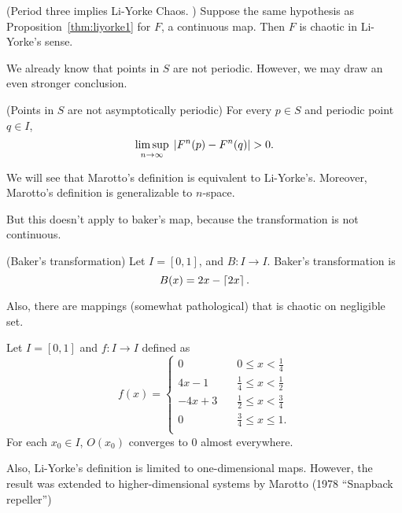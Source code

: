 \documentclass[11pt]{book}
\begin{document}
\begin{proposition}
  (Period three implies Li-Yorke Chaos. \cite{li-yorke})
  Suppose the same hypothesis as Proposition~\ref{thm:liyorke1} for $F$,
  a continuous map.
  Then $F$ is chaotic in Li-Yorke's sense.
\end{proposition}

We already know that points in $S$ are not periodic.
However, we may draw an even stronger conclusion.
\begin{proposition}
  (Points in $S$ are not asymptotically periodic)
  For every $p \in S$ and periodic point $q \in I$,
  \begin{equation*}
    \limsup\limits_{n \to \infty}\; \left | F^n(p) - F^n(q) \right | > 0.
  \end{equation*}
\end{proposition}

  We will see that Marotto's definition is equivalent to Li-Yorke's.
Moreover, Marotto's definition is generalizable to $n$-space.

But this doesn't apply to baker's map, because the transformation is not continuous.
\begin{definition}
  (Baker's transformation)
  Let $I = [0,1]$, and $B: I \to I$. Baker's transformation is
  \begin{equation*}
    B(x) = 2x - \left \lceil 2x \right \rceil.
  \end{equation*}
\end{definition}

Also, there are mappings  (somewhat pathological) that is chaotic on negligible set.
\begin{proposition}
  Let $I = [0,1]$ and $f: I \to I$ defined as
  \begin{equation*}
    f(x) =
    \begin{cases}
      0 \quad & 0\leq x < \frac{1}{4} \\
      4x - 1 \quad  & \frac{1}{4} \leq x < \frac{1}{2} \\
      -4x + 3 \quad & \frac{1}{2} \leq x < \frac{3}{4} \\
      0 \quad & \frac{3}{4} \leq x \leq 1. \\
    \end{cases}
  \end{equation*}
  For each $x_0 \in I$, $O(x_0)$ converges to 0 almost everywhere.
\end{proposition}

Also, Li-Yorke's definition is limited to one-dimensional maps.
However, the result was extended to higher-dimensional systems by Marotto (1978 ``Snapback repeller'')



\end{document}
